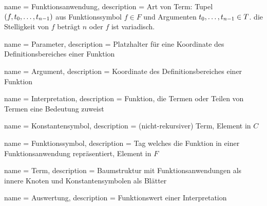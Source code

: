 

\makeglossaries

{
    name = {Funktionsanwendung},
    description = {Art von Term: Tupel $(f, {t}_{0}, \dots, {t}_{n-1})$ aus Funktionssymbol ${f \in F}$ und Argumenten ${{t}_{0}, \dots, {t}_{n-1} \in T}$. die Stelligkeit von $f$ beträgt $n$ oder $f$ ist variadisch.}
}

{
    name = Parameter,
    description = {Platzhalter für eine Koordinate des Definitionsbereiches einer Funktion}
}

{
    name = Argument,
    description = {Koordinate des Definitionsbereiches einer Funktion}
}

{
    name = Interpretation,
    description = {Funktion, die Termen oder Teilen von Termen eine Bedeutung zuweist}
}

{
    name = Konstantensymbol,
    description = {(nicht-rekursiver) Term, Element in $C$}
}

{
    name = Funktionssymbol,
    description = {Tag welches die Funktion in einer Funktionsanwendung repräsentiert, Element in $F$}
}

{
    name = Term,
    description = {Baumstruktur mit Funktionsanwendungen als innere Knoten und Konstantensymbolen als Blätter}
}

{
    name = Auswertung,
    description = {Funktionswert einer Interpretation}
}




